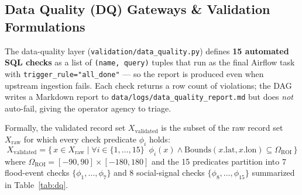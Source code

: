 \documentclass[11pt,a4paper]{article}
\begin{document}
\subsection{Data Quality (DQ) Gateways \& Validation Formulations}

The data-quality layer (\texttt{validation/data\_quality.py}) defines
\textbf{15 automated SQL checks} as a list of \texttt{(name, query)} tuples
that run as the final Airflow task with
\texttt{trigger\_rule="all\_done"} --- so the report is produced even when
upstream ingestion fails. Each check returns a row count of violations; the
DAG writes a Markdown report to
\texttt{data/logs/data\_quality\_report.md} but does \emph{not} auto-fail,
giving the operator agency to triage.

Formally, the validated record set $X_{\text{validated}}$ is the subset of
the raw record set $X_{\text{raw}}$ for which every check predicate
$\phi_i$ holds:
\begin{equation}
    X_{\text{validated}} = \{\, x \in X_{\text{raw}} \mid
        \forall i \in \{1,\dots,15\}\;\; \phi_i(x) \land
        \mathrm{Bounds}(x.\text{lat}, x.\text{lon}) \subseteq \Omega_{\text{ROI}} \,\}
\end{equation}
where $\Omega_{\text{ROI}} = [-90, 90] \times [-180, 180]$ and the 15
predicates partition into 7 flood-event checks
$\{\phi_1,\dots,\phi_7\}$ and 8 social-signal checks
$\{\phi_8,\dots,\phi_{15}\}$ summarized in Table~\ref{tab:dq}.
\end{document}
